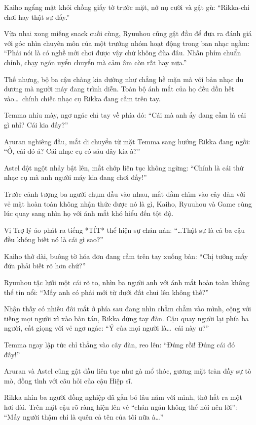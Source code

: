 \documentclass[../main.tex]{subfiles}
\begin{document}

Kaiho ngẩng mặt khỏi chồng giấy tờ trước mặt, nở nụ cười và gật gù: ``Rikka-chi chơi hay thật sự đấy.''

Vừa nhai xong miếng snack cuối cùng, Ryuuhou cũng gật đầu để đưa ra đánh giá với góc nhìn chuyên môn của một trưởng nhóm hoạt động trong ban nhạc ngầm: ``Phải nói là có nghề mới chơi được vậy chứ không đùa đâu. Nhấn phím chuẩn chỉnh, chạy ngón uyển chuyển mà cảm âm còn rất hay nữa.''

Thế nhưng, bộ ba cậu chàng kia dường như chẳng hề mặn mà với bản nhạc du dương mà người máy đang trình diễn. Toàn bộ ánh mắt của họ đều dồn hết vào\dots\ chính chiếc nhạc cụ Rikka đang cầm trên tay.

Temma nhíu mày, ngơ ngác chỉ tay về phía đó: ``Cái mà anh ấy đang cầm là cái gì nhỉ? Cái kia đấy?''

Aruran nghiêng đầu, mắt di chuyển từ mặt Temma sang hướng Rikka đang ngồi: ``Ồ, cái đó á? Cái nhạc cụ có sáu dây kia à?''

Astel đột ngột nhảy bật lên, mắt chớp liên tục không ngừng: ``Chính là cái thứ nhạc cụ mà anh người máy kia đang chơi đấy!''

Trước cảnh tượng ba người chụm đầu vào nhau, mắt đắm chìm vào cây đàn với vẻ mặt hoàn toàn không nhận thức được nó là gì, Kaiho, Ryuuhou và Game cùng lúc quay sang nhìn họ với ánh mắt khó hiểu đến tột độ.

Vị Trợ lý ảo phát ra tiếng *TÍT* thể hiện sự chán nản: ``\dots Thật sự là cả ba cậu đều không biết nó là cái gì sao?''

Kaiho thở dài, buông tờ hóa đơn đang cầm trên tay xuống bàn: ``Chị tưởng mấy đứa phải biết rõ hơn chứ?''

Ryuuhou tặc lưỡi một cái rõ to, nhìn ba người anh với ánh mắt hoàn toàn không thể tin nổi: ``Mấy anh có phải mới từ dưới đất chui lên không thế?''

Nhận thấy có nhiều đôi mắt ở phía sau đang nhìn chằm chằm vào mình, cộng với tiếng mọi người xì xào bàn tán, Rikka dừng tay đàn. Cậu quay người lại phía ba người, cất giọng với vẻ ngơ ngác: ``Ý của mọi người là\dots\ cái này ư?''

Temma ngay lập tức chỉ thẳng vào cây đàn, reo lên: ``Đúng rồi! Đúng cái đó đấy!''

Aruran và Astel cũng gật đầu liên tục như gà mổ thóc, gương mặt tràn đầy sự tò mò, đồng tình với câu hỏi của cậu Hiệp sĩ.

Rikka nhìn ba người đồng nghiệp đã gắn bó lâu năm với mình, thở hắt ra một hơi dài. Trên mặt cậu rõ ràng hiện lên vẻ ``chán ngán không thể nói nên lời'': ``Mấy người thậm chí là quên cả tên của tôi nữa à\dots''
\end{document}
